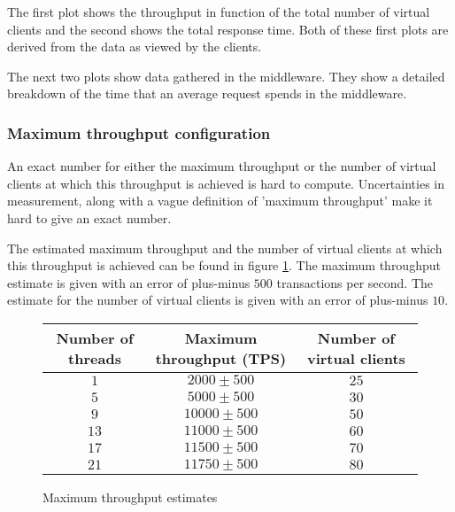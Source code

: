 \documentclass[11pt]{article}
\begin{document}
The first plot shows the throughput in function of the total number of virtual clients and the second shows the total response time.
Both of these first plots are derived from the data as viewed by the clients.

The next two plots show data gathered in the middleware.
They show a detailed breakdown of the time that an average request spends in the middleware.

\subsubsection{Maximum throughput configuration}


An exact number for either the maximum throughput or the number of virtual clients at which this throughput is achieved is hard to compute.
Uncertainties in measurement, along with a vague definition of 'maximum throughput' make it hard to give an exact number.

The estimated maximum throughput and the number of virtual clients at which this throughput is achieved can be found in figure \ref{fig:maximum-throughput-numbers}.
The maximum throughput estimate is given with an error of plus-minus $500$ transactions per second.
The estimate for the number of virtual clients is given with an error of plus-minus $10$.

\begin{figure}[H]
  \centering
  \begin{tabular}{c|c|c}
    Number of threads & Maximum throughput (TPS) & Number of virtual clients \\
    \hline $1$ & $2000 \pm 500$ & $25$ \\
    \hline $5$ & $5000 \pm 500$ & $30$ \\
    \hline $9$ & $10000 \pm 500$ & $50$ \\
    \hline $13$ & $11000 \pm 500$ & $60$ \\
    \hline $17$ & $11500 \pm 500$ & $70$ \\
    \hline $21$ & $11750 \pm 500$ & $80$ \\
  \end{tabular}
  \caption{Maximum throughput estimates}
  \label{fig:maximum-throughput-numbers}
\end{figure}
\end{document}
